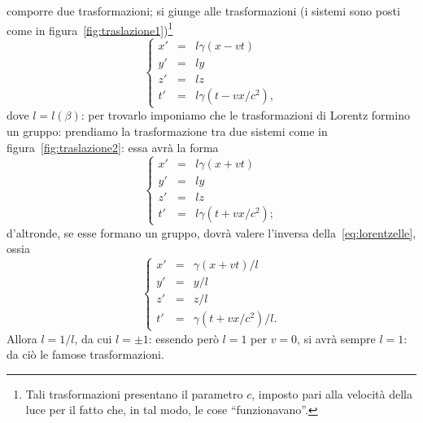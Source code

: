comporre due trasformazioni; si giunge alle trasformazioni (i sistemi
sono posti come in figura~\ref{fig:traslazione1})\footnote{Tali
trasformazioni presentano il parametro $c$, imposto pari alla velocit\`a
della luce per il fatto che, in tal modo, le cose ``funzionavano''.}
\begin{equation}
  \left\{
    \begin{array}{rcl}
      x' & = & l \gamma (x - v t)  \\
      y' & = & l y \\
      z' & = & l z \\
      t'  & = & l \gamma (t - v x / c^{2}),
    \end{array}
  \right.
  \label{eq:lorentzelle}
\end{equation}
dove $l = l (\beta)$: per trovarlo imponiamo che le trasformazioni di
Lorentz formino un gruppo: prendiamo la trasformazione tra due sistemi
come in figura~\ref{fig:traslazione2}: essa avr\`a la forma 
\begin{equation}
  \left\{
    \begin{array}{rcl}
      x' & = & l \gamma (x + v t)  \\
      y' & = & l y \\
      z' & = & l z \\
      t'  & = & l \gamma (t + v x / c^{2});
    \end{array}
  \right.
  \label{eq:lorentzvmeno}
\end{equation}
d'altronde, se esse formano un gruppo, dovr\`a valere l'inversa
della~\eqref{eq:lorentzelle}, ossia
\begin{equation}
  \left\{
    \begin{array}{rcl}
      x' & = &  \gamma (x + v t)/l  \\
      y' & = & y/l \\
      z' & = &  z/l \\
      t'  & = & \gamma (t + v x / c^{2}) /l.
    \end{array}
  \right.
  \label{eq:lorentz_inv}
\end{equation}
Allora $l=1/l$, da cui $l=\pm 1$: essendo per\`o $l=1$ per $v=0$, si
avr\`a sempre $l=1$: da ci\`o le famose trasformazioni.
